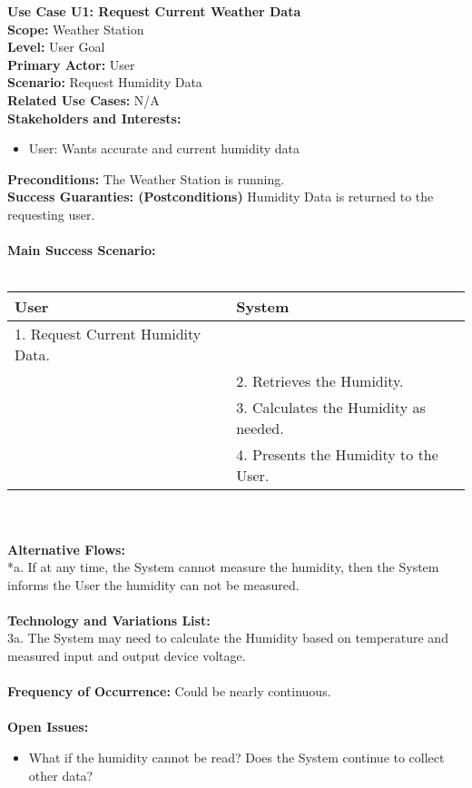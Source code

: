 \documentclass[letterpaper]{article}
\begin{document}
\noindent
\textbf{Use Case U1:  Request Current Weather Data}\\
\textbf{Scope:  }Weather Station\\
\textbf{Level:  }User Goal\\
\textbf{Primary Actor:  }User\\
\textbf{Scenario:  }Request Humidity Data\\
\textbf{Related Use Cases:  }N/A\\
\textbf{Stakeholders and Interests:}
\begin{itemize}
\item User:  Wants accurate and current humidity data
\end{itemize}
\textbf{Preconditions:  }The Weather Station is running.\\
\textbf{Success Guaranties:  (Postconditions)} 
Humidity Data is returned to the requesting user.\\\\
\textbf{Main Success Scenario: }\\\\
\begin{tabular}{|p{6cm}|p{6cm}|}\hline
\textbf{User} & \textbf{System}\\\hline
1.  Request Current Humidity Data. 
& \\\hline
&2.  Retrieves the Humidity.\\\hline
&3.  Calculates the Humidity as needed.\\\hline
&4.  Presents the Humidity to the User.\\\hline
\end{tabular}\\\\
\textbf{Alternative Flows:  }\\
*a.  If at any time, the System cannot measure the humidity, then
the System informs the User the humidity can not be measured.\\\\
\textbf{Technology and Variations List:  }\\
3a.  The System may need to calculate the Humidity based on
temperature and measured input and output device voltage.\\\\
\textbf{Frequency of Occurrence:  }Could be nearly continuous.\\\\
\textbf{Open Issues:  }
\begin{itemize}
\item What if the humidity cannot be read?  Does the System continue
to collect other data?
\end{itemize}
\end{document}

